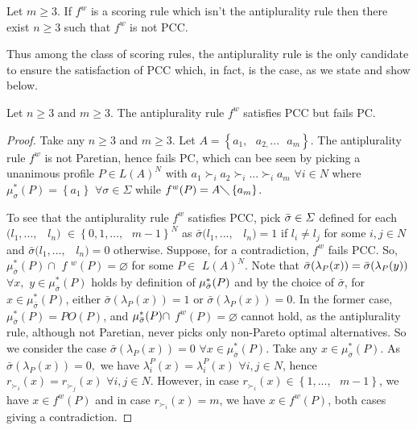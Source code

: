\documentclass[version=3.21, pagesize, twoside=off, bibliography=totoc, DIV=calc, fontsize=12pt, a4paper]{scrartcl}
\begin{document}
\begin{proposition}
Let $m\geq 3$. If $f^w$ is a scoring rule which isn't the antiplurality
rule then there exist $n\geq 3$ such that $f^w$ is not PCC.
\end{proposition}

Thus among the class of scoring rules, the antiplurality rule is the only
candidate to ensure the satisfaction of PCC which, in fact, is the case, as
we state and show below.

\begin{proposition}
Let $n\geq 3$ and $m\geq 3.$ The antiplurality rule $f^w$ satisfies PCC
but fails PC.
\end{proposition}

\begin{proof}
Take any $n\geq 3$ and $m\geq 3.$ Let $A=\left\{ a_{1},\text{ }a_{2,}...%
\text{ }a_{m}\right\} $. The antiplurality rule $f^w$ is not Paretian,
hence fails PC, which can bee seen by picking a unanimous profile $P\in
L(A)^{N}$ with $a_{1}\succ _{i}a_{2}\succ _{i}...\succ _{i}a_{m}$ $\forall
i\in N$ where $\mu _{\sigma }^{\ast }(P)=\left\{ a_{1}\right\} $ $\forall
\sigma \in \Sigma $ while $f^w(P)=A\diagdown \left\{ a_{m}\right\} $.

To see that the antiplurality rule $f^w$ satisfies PCC, pick $\bar{%
\sigma }\in \Sigma $ defined for each $(l_{1},...,$ \ $l_{n})$ $\in \left\{
0,1,...,\text{ }m-1\right\} ^{N}$ as $\bar{\sigma }(l_{1},...,$ \ $%
l_{n})=1$ if $l_{i}\neq l_{j}$ for some $i,j\in N$ and $\bar{\sigma }%
(l_{1},...,$ \ $l_{n})=0$ otherwise. Suppose, for a contradiction, $f^w$
fails PCC. So, $\mu _{\bar{\sigma }}^{\ast }(P)\cap $ $f$ $%
^{w}(P)=\varnothing $ for some $P\in $ $L(A)^{N}$. Note that $\bar{%
\sigma }(\lambda _{P}(x))=\bar{\sigma }(\lambda _{P}(y))$ $\forall x,$ $%
y\in \mu _{\bar{\sigma }}^{\ast }(P)$ holds by definition of $\mu _{%
\bar{\sigma }}^{\ast }(P)$ and by the choice of $\bar{\sigma }$,
for $x\in \mu _{\bar{\sigma }}^{\ast }(P)$, either $\bar{\sigma }%
(\lambda _{P}(x))=1$ or $\bar{\sigma }(\lambda _{P}(x))=0$. In the
former case, $\mu _{\bar{\sigma }}^{\ast }(P)=PO(P)$, and $\mu _{%
\bar{\sigma }}^{\ast }(P)\cap $ $f^w(P)=\varnothing $ cannot hold,
as the antiplurality rule, although not Paretian, never picks only
non-Pareto optimal alternatives. So we consider the case $\bar{\sigma }%
(\lambda _{P}(x))=0$ $\forall x\in \mu _{\bar{\sigma }}^{\ast }(P)$.
Take any $x\in \mu _{\bar{\sigma }}^{\ast }(P)$. As $\bar{\sigma }%
(\lambda _{P}(x))=0,$ we have $\lambda _{i}^{P}(x)=\lambda _{i}^{P}(x)$ $%
\forall i,j\in N$, hence $r_{\succ _{i}}(x)=r_{\succ _{j}}(x)$ $\forall
i,j\in N$. However, in case $r_{\succ _{i}}(x)\in \left\{ 1,...,\text{ }%
m-1\right\} $, we have $x\in f^w(P)$ and in case $r_{\succ _{i}}(x)=m$,
we have $x\in f^w(P)$, both cases giving a contradiction.
\end{proof}
\end{document}
